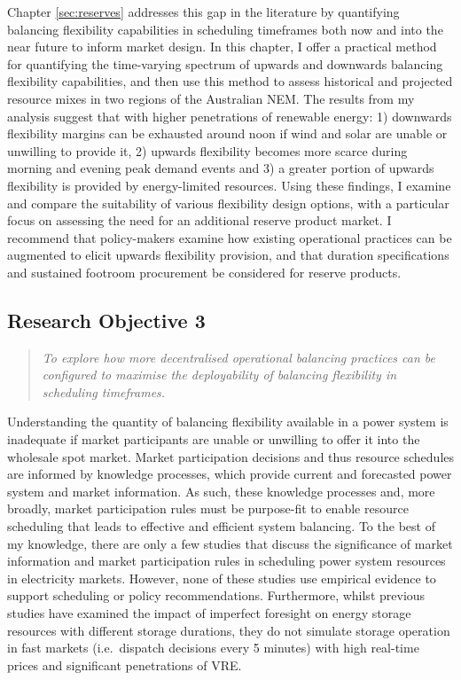 \documentclass[12pt,a4paper,]{report}
\begin{document}
Chapter \ref{sec:reserves} addresses this gap in the literature by
quantifying balancing flexibility capabilities in scheduling timeframes
both now and into the near future to inform market design. In this
chapter, I offer a practical method for quantifying the time-varying
spectrum of upwards and downwards balancing flexibility capabilities,
and then use this method to assess historical and projected resource
mixes in two regions of the Australian NEM. The results from my analysis
suggest that with higher penetrations of renewable energy: 1) downwards
flexibility margins can be exhausted around noon if wind and solar are
unable or unwilling to provide it, 2) upwards flexibility becomes more
scarce during morning and evening peak demand events and 3) a greater
portion of upwards flexibility is provided by energy-limited resources.
Using these findings, I examine and compare the suitability of various
flexibility design options, with a particular focus on assessing the
need for an additional reserve product market. I recommend that
policy-makers examine how existing operational practices can be
augmented to elicit upwards flexibility provision, and that duration
specifications and sustained footroom procurement be considered for
reserve products.

\hypertarget{research-objective-3}{%
\subsection{Research Objective 3}\label{research-objective-3}}

\begin{quote}
\emph{To explore how more decentralised operational balancing practices
can be configured to maximise the deployability of balancing flexibility
in scheduling timeframes.}
\end{quote}

Understanding the quantity of balancing flexibility available in a power
system is inadequate if market participants are unable or unwilling to
offer it into the wholesale spot market. Market participation decisions
and thus resource schedules are informed by knowledge processes, which
provide current and forecasted power system and market information. As
such, these knowledge processes and, more broadly, market participation
rules must be purpose-fit to enable resource scheduling that leads to
effective and efficient system balancing. To the best of my knowledge,
there are only a few studies that discuss the significance of market
information and market participation rules in scheduling power system
resources in electricity markets. However, none of these studies use
empirical evidence to support scheduling or policy recommendations.
Furthermore, whilst previous studies have examined the impact of
imperfect foresight on energy storage resources with different storage
durations, they do not simulate storage operation in fast markets
(i.e.~dispatch decisions every 5 minutes) with high real-time prices and
significant penetrations of VRE.
\end{document}
